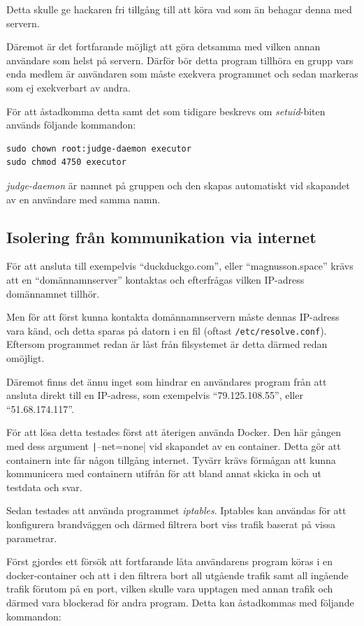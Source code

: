 \documentclass{article}
\begin{document}
Detta skulle ge hackaren fri tillgång till att köra vad som än behagar denna med
servern.

Däremot är det fortfarande möjligt att göra detsamma med vilken annan användare
som helst på servern. Därför bör detta program tillhöra en grupp vars enda
medlem är användaren som måste exekvera programmet och sedan markeras som ej
exekverbart av andra.

För att åstadkomma detta samt det som tidigare beskrevs om \textit{setuid}-biten
används följande kommandon:

\begin{verbatim}
sudo chown root:judge-daemon executor
sudo chmod 4750 executor
\end{verbatim}

\textit{judge-daemon} är namnet på gruppen och den skapas automatiskt vid
skapandet av en användare med samma namn.

\subsection{Isolering från kommunikation via internet}

För att ansluta till exempelvis ``duckduckgo.com'', eller ``magnusson.space''
krävs att en ``domännamnserver'' kontaktas och efterfrågas vilken IP-adress
domännamnet tillhör.

Men för att först kunna kontakta domännamnservern måste dennas IP-adress vara
känd, och detta sparas på datorn i en fil (oftast \texttt{/etc/resolve.conf}).
Eftersom programmet redan är låst från filsystemet är detta därmed redan
omöjligt.

Däremot finns det ännu inget som hindrar en användares program från att ansluta
direkt till en IP-adress, som exempelvis ``79.125.108.55'', eller \\
``51.68.174.117''.

För att lösa detta testades först att återigen använda Docker. Den här gången
med dess argument \texttt|--net=none| vid skapandet av en container. Detta gör
att containern inte får någon tillgång internet. Tyvärr krävs förmågan att kunna
kommunicera med containern utifrån för att bland annat skicka in och ut testdata
och svar.

Sedan testades att använda programmet \textit{iptables}. Iptables kan användas
för att konfigurera brandväggen och därmed filtrera bort viss trafik baserat på
vissa parametrar.

Först gjordes ett försök att fortfarande låta användarens program köras i en
docker-container och att i den filtrera bort all utgående trafik samt all
ingående trafik förutom på en port, vilken skulle vara upptagen med annan
trafik och därmed vara blockerad för andra program. Detta kan åstadkommas med
följande kommandon:
\end{document}
